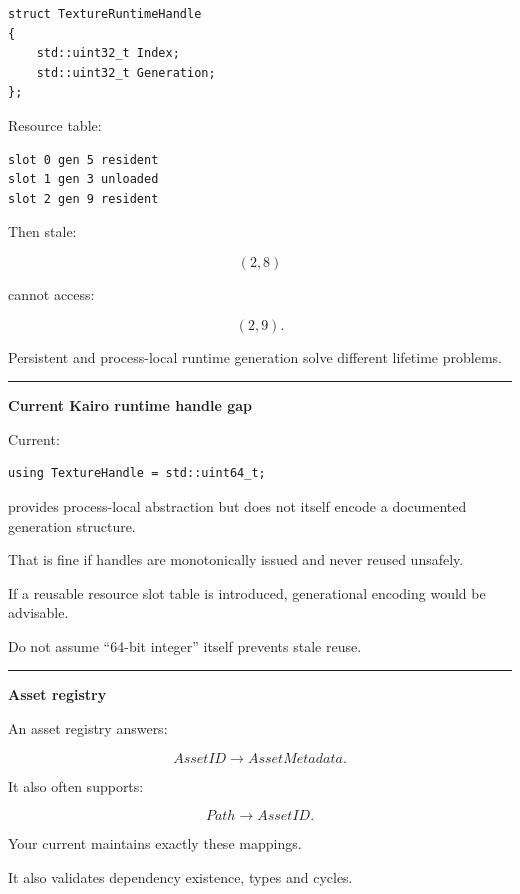 \begin{verbatim}
struct TextureRuntimeHandle
{
    std::uint32_t Index;
    std::uint32_t Generation;
};
\end{verbatim}

Resource table:

\begin{verbatim}
slot 0 gen 5 resident
slot 1 gen 3 unloaded
slot 2 gen 9 resident
\end{verbatim}

Then stale:

\[
(2,8)
\]

cannot access:

\[
(2,9).
\]

Persistent  and process-local runtime generation solve different lifetime problems.

\begin{center}\rule{0.5\linewidth}{0.5pt}\end{center}

\textbf{Current Kairo runtime handle gap}

Current:

\begin{verbatim}
using TextureHandle = std::uint64_t;
\end{verbatim}

provides process-local abstraction but does not itself encode a documented generation structure.

That is fine if handles are monotonically issued and never reused unsafely.

If a reusable resource slot table is introduced, generational encoding would be advisable.

Do not assume ``64-bit integer'' itself prevents stale reuse.

\begin{center}\rule{0.5\linewidth}{0.5pt}\end{center}

\textbf{Asset registry}

An asset registry answers:

\[
AssetID\rightarrow AssetMetadata.
\]

It also often supports:

\[
Path\rightarrow AssetID.
\]

Your current  maintains exactly these mappings.

It also validates dependency existence, types and cycles.

